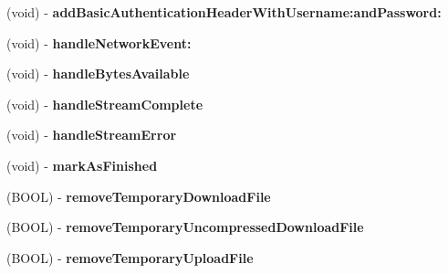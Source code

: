 \begin{DoxyCompactItemize}
\item 
\hypertarget{interface_a_s_i_h_t_t_p_request_a0295b7fbbc9af2be76f9dfe06f75f1ca}{
(void) -\/ {\bfseries add\-Basic\-Authentication\-Header\-With\-Username\-:and\-Password\-:}}
\label{interface_a_s_i_h_t_t_p_request_a0295b7fbbc9af2be76f9dfe06f75f1ca}

\item 
\hypertarget{interface_a_s_i_h_t_t_p_request_a271ec6e669cafa5063866022fb3577ba}{
(void) -\/ {\bfseries handle\-Network\-Event\-:}}
\label{interface_a_s_i_h_t_t_p_request_a271ec6e669cafa5063866022fb3577ba}

\item 
\hypertarget{interface_a_s_i_h_t_t_p_request_aefae44a699dc9e70b78930322cfb3558}{
(void) -\/ {\bfseries handle\-Bytes\-Available}}
\label{interface_a_s_i_h_t_t_p_request_aefae44a699dc9e70b78930322cfb3558}

\item 
\hypertarget{interface_a_s_i_h_t_t_p_request_aaf27f7d11cd1194d5087db56cc553d89}{
(void) -\/ {\bfseries handle\-Stream\-Complete}}
\label{interface_a_s_i_h_t_t_p_request_aaf27f7d11cd1194d5087db56cc553d89}

\item 
\hypertarget{interface_a_s_i_h_t_t_p_request_ab792c755bbcec55490688d2b5aa729ec}{
(void) -\/ {\bfseries handle\-Stream\-Error}}
\label{interface_a_s_i_h_t_t_p_request_ab792c755bbcec55490688d2b5aa729ec}

\item 
\hypertarget{interface_a_s_i_h_t_t_p_request_a0b812d27bc2a7ad7715e6d890923426e}{
(void) -\/ {\bfseries mark\-As\-Finished}}
\label{interface_a_s_i_h_t_t_p_request_a0b812d27bc2a7ad7715e6d890923426e}

\item 
\hypertarget{interface_a_s_i_h_t_t_p_request_a0e68fd4f22a1b5cdcfb3e63a3cdacde9}{
(\-B\-O\-O\-L) -\/ {\bfseries remove\-Temporary\-Download\-File}}
\label{interface_a_s_i_h_t_t_p_request_a0e68fd4f22a1b5cdcfb3e63a3cdacde9}

\item 
\hypertarget{interface_a_s_i_h_t_t_p_request_af8ef43877926d01b8a51abb62dd2e208}{
(\-B\-O\-O\-L) -\/ {\bfseries remove\-Temporary\-Uncompressed\-Download\-File}}
\label{interface_a_s_i_h_t_t_p_request_af8ef43877926d01b8a51abb62dd2e208}

\item 
\hypertarget{interface_a_s_i_h_t_t_p_request_aaf8e3adbbf00110b67232158921553c0}{
(\-B\-O\-O\-L) -\/ {\bfseries remove\-Temporary\-Upload\-File}}
\label{interface_a_s_i_h_t_t_p_request_aaf8e3adbbf00110b67232158921553c0}


\end{DoxyCompactItemize}
